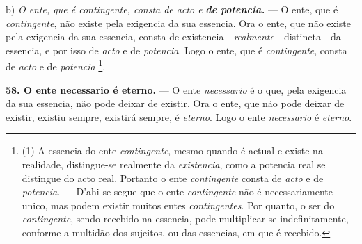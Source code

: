 b) \emph{O ente, que é contingente, consta de acto e} \textbf{\emph{de potencia.}} — O ente, que é \emph{contingente}, não existe pela exigencia da sua essencia. Ora o ente, que não existe pela exigencia da sua essencia, consta de existencia—\emph{realmente}—distincta—da essencia, e por isso de \emph{acto} e de \emph{potencia}. Logo o ente, que é \emph{contingente}, consta de \emph{acto} e de \emph{potencia} \footnote{(1) A essencia do ente \emph{contingente}, mesmo quando é actual e existe na realidade, distingue-se realmente da \emph{existencia}, como a potencia real se distingue do acto real. Portanto o ente \emph{contingente} consta de \emph{acto} e de \emph{potencia}. — D'ahi se segue que o ente \emph{contingente} não é necessariamente unico, mas podem existir muitos entes \emph{contingentes}. Por quanto, o ser do \emph{contingente}, sendo recebido na essencia, pode multiplicar-se indefinitamente, conforme a multidão dos sujeitos, ou das essencias, em que é recebido.}.

\textbf{58. O ente necessario é eterno.} — O ente \emph{necessario} é o que, pela exigencia da sua essencia, não pode deixar de existir. Ora o ente, que não pode deixar de existir, existiu sempre, existirá sempre, é \emph{eterno}. Logo o ente \emph{necessario} é \emph{eterno}.


